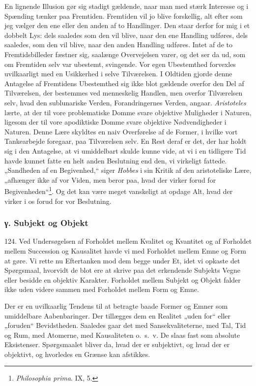\documentclass[12pt,a4paper]{book}
\newcommand{\apage}[1]{\marginnote{\footnotesize\textit{[#1]}}}
\begin{document}
\apage{295} En lignende Illusion gør sig stadigt gældende, naar man med stærk Interesse og i
Spænding tænker paa Fremtiden. Fremtiden vil jo blive forskellig, alt efter som jeg
vælger den ene eller den anden af to Handlinger. Den staar derfor for mig i et dobbelt
Lys: dels saaledes som den vil blive, naar den ene Handling udføres, dels saaledes,
som den vil blive, naar den anden Handling udføres. Intet af de to Fremtidsbilleder
fæstner sig, saalænge Overvejelsen varer, og det ser da ud, som om Fremtiden selv var
ubestemt, svingende. Vor egen Ubestemthed forvexles uvilkaarligt med en Usikkerhed i
selve Tilværelsen. I Oldtiden gjorde denne Antagelse af Fremtidens Ubestemthed sig
ikke blot gældende overfor den Del af Tilværelsen, der bestemmes ved menneskelig
Handlen, men overfor Tilværelsen selv, hvad den sublunariske Verden, Forandringernes
Verden, angaar. \emph{Aristoteles} lærte, at der til vore problematiske Domme svare
objektive Muligheder i Naturen, ligesom der til vore apodiktiske Domme svare objektive
Nødvendigheder i Naturen. Denne Lære skyldtes en naiv Overførelse af de Former, i
hvilke vort Tankearbejde foregaar, paa Tilværelsen selv. En Rest deraf er det, der har
holdt sig i den Antagelse, at vi umiddelbart skulde kunne vide, at vi i en tidligere
Tid havde kunnet fatte en helt anden Beslutning end den, vi virkeligt fattede.
„Sandheden af en Begivenhed,“ siger \emph{Hobbes} i sin Kritik af den aristoteliske
Lære, „afhænger ikke af vor Viden, men beror paa, hvad der virker forud for
Begivenheden“\footnote{\emph{Philosophia prima}. IX, 5.}. Og det kan være meget
vanskeligt at opdage Alt, hvad der virker i os forud for vor Beslutning.

\subsubsection*{γ. Subjekt og Objekt}

124. Ved Undersøgelsen af Forholdet mellem Kvalitet og Kvantitet og af Forholdet
mellem Succession og Kausalitet havde vi med Forholdet mellem Emne og Form at gøre. Vi
rette nu Eftertanken mod dem begge under Et, idet vi opkaste det Spørgsmaal, hvorvidt
de blot ere at skrive paa det erkendende Subjekts Vegne eller besidde en objektiv \apage{296}
Karakter. Forholdet mellem Subjekt og Objekt falder ikke uden videre sammen med
Forholdet mellem Form og Emne.

Der er en uvilkaarlig Tendens til at betragte baade Former og Emner som umiddelbare
Aabenbaringer. Der tillægges dem en Realitet „uden for“ eller „foruden“ Bevidstheden.
Saaledes gaar det med Sansekvaliteterne, med Tal, Tid og Rum, med Atomerne, med
Kausaliteten o.\ s.\ v. De slaas fast som absolute Eksistenser. Spørgsmaalet bliver
da, hvad der er subjektivt, og hvad der er objektivt, og hvorledes en Grænse kan
afstikkes.
\end{document}
